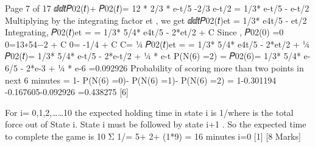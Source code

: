 Page 7 of 17
ⅆⅆ𝑡𝑃02(𝑡)+ 𝑃02(𝑡)= 12 * {2/3 * e-t/5 -2/3 e-t/2 }
= 1/3* { e-t/5 - e-t/2 }
Multiplying by the integrating factor et , we get
ⅆⅆ𝑡{𝑃02(𝑡)et} = 1/3* { e4t/5 - et/2 }
Integrating,
𝑃02(𝑡)et = = 1/3* {5/4* e4t/5 - 2*et/2 } + C
Since , 𝑃02(0) =0
0=13∗{54−2} + C
0= -1/4 + C
C= ¼
𝑃02(𝑡)et = = 1/3* {5/4* e4t/5 - 2*et/2 } + ¼
𝑃02(𝑡)= 1/3* {5/4* e-t/5 - 2*e-t/2 } + ¼ * e-t
P(N(6) =2) = 𝑃02(6)= 1/3* {5/4* e-6/5 - 2*e-3 } + ¼ * e-6
=0.092926
Probability of scoring more than two points in next 6 minutes
= 1- P(N(6) =0)- P(N(6) =1)- P(N(6) =2)
= 1-0.301194 -0.167605-0.092926
=0.438275
[6]
\item
For i= 0,1,2,……10 the expected holding time in state i is 1/\lambdai where \lambdai is the total force out of State i.
State i must be followed by state i+1 . So the expected time to complete the game is
10
Σ 1/\lambdai = 5+ 2+ (1*9) = 16 minutes
i=0
[1]
[8 Marks]

